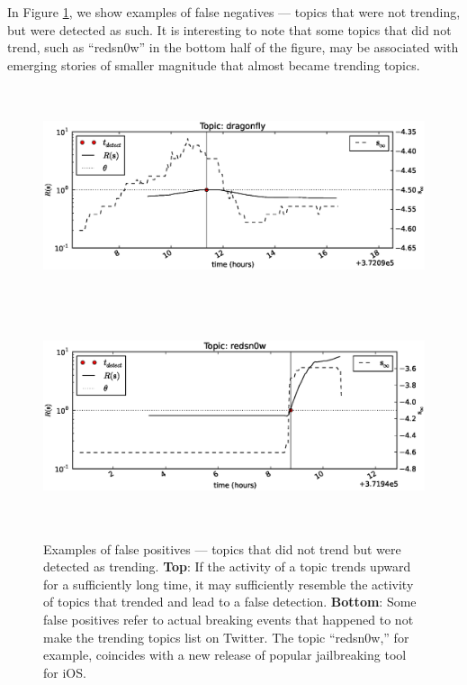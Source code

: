 In Figure \ref{fig:examples3}, we show examples of false negatives --- topics
that were not trending, but were detected as such. It is interesting to note
that some topics that did not trend, such as ``redsn0w'' in the bottom half of
the figure, may be associated with emerging stories of smaller magnitude that
almost became trending topics.
\begin{figure}[!h]
\begin{center}
\includegraphics[height=2.5in]{../fig/final/detection_examples/fp/dragonfly.eps}
\includegraphics[height=2.5in]{../fig/final/detection_examples/fp/redsn0w.eps}
\end{center}
\caption{\label{fig:examples3} Examples of false positives --- topics that did
  not trend but were detected as trending. {\bf Top}: If the activity of a topic trends
  upward for a sufficiently long time, it may sufficiently resemble the activity
  of topics that trended and lead to a false detection. {\bf Bottom}: Some false positives
  refer to actual breaking events that happened to not make the trending topics
  list on Twitter. The topic ``redsn0w,'' for example, coincides with a new
  release of popular jailbreaking tool for iOS.}
\end{figure}

